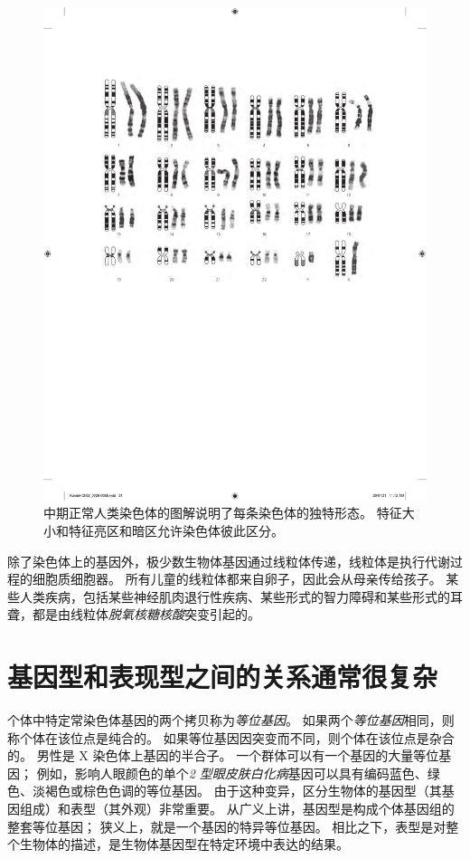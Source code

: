 \begin{figure}[htbp]
	\centering
	\includegraphics[width=0.8\linewidth]{chap02/fig_2_4}
	\caption{中期正常人类染色体的图解说明了每条染色体的独特形态。
		特征大小和特征亮区和暗区允许染色体彼此区分\cite{watoson1983recombinant}。}
	\label{fig:2_4}
\end{figure}


除了染色体上的基因外，极少数生物体基因通过线粒体传递，线粒体是执行代谢过程的细胞质细胞器。
所有儿童的线粒体都来自卵子，因此会从母亲传给孩子。
某些人类疾病，包括某些神经肌肉退行性疾病、某些形式的智力障碍和某些形式的耳聋，都是由线粒体\textit{脱氧核糖核酸}突变引起的。



\section{基因型和表现型之间的关系通常很复杂}

个体中特定常染色体基因的两个拷贝称为\textit{等位基因}。
如果两个\textit{等位基因}相同，则称个体在该位点是纯合的。
如果等位基因因突变而不同，则个体在该位点是杂合的。
男性是 X 染色体上基因的半合子。
一个群体可以有一个基因的大量等位基因；
例如，影响人眼颜色的单个\textit{2 型眼皮肤白化病}基因可以具有编码蓝色、绿色、淡褐色或棕色色调的等位基因。
由于这种变异，区分生物体的基因型（其基因组成）和表型（其外观）非常重要。
从广义上讲，基因型是构成个体基因组的整套等位基因；
狭义上，就是一个基因的特异等位基因。
相比之下，表型是对整个生物体的描述，是生物体基因型在特定环境中表达的结果。


